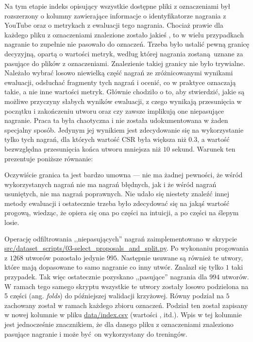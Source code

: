 Na tym etapie indeks opisujący wszystkie dostępne pliki z oznaczeniami był rozszerzony o kolumny zawierające informacje o identyfikatorze nagrania z YouTube oraz o metrykach z ewaluacji tego nagrania. Chociaż prawie dla każdego pliku z oznaczeniami znalezione zostało jakieś , to w wielu przypadkach nagranie to zupełnie nie pasowało do oznaczeń. Trzeba było ustalić pewną granicę decyzyjną, opartą o wartości metryk, według której nagrania zostaną uznane za pasujące do plików z oznaczeniami. Znalezienie takiej granicy nie było trywialne. Należało wybrać losowo niewielką część nagrań ze zróżnicowanymi wynikami ewaluacji, odsłuchać fragmenty tych nagrań i ocenić, co w praktyce oznaczają takie, a nie inne wartości metryk. Głównie chodziło o to, aby stwierdzić, jakie są możliwe przyczyny słabych wyników ewaluacji, z czego wynikają przesunięcia w początku i zakończeniu utworu oraz czy zawsze implikują one niepasujące nagranie. Praca ta była chaotyczna i nie została udokumentowana w żaden specjalny sposób. Jedynym jej wynikiem jest zdecydowanie się na wykorzystanie tylko tych nagrań, dla których wartość CSR była większa niż $0.3$, a wartość bezwzględna przesunięcia końca utworu mniejsza niż $10$ sekund. Warunek ten prezentuje poniższe równanie:
\begin{center}
\end{center}
Oczywiście granica ta jest bardzo umowna --- nie ma żadnej pewności, że wśród wykorzystanych nagrań nie ma nagrań błędnych, jak i że wśród nagrań usuniętych, nie ma nagrań poprawnych. Nie udało się niestety znaleźć innej metody ewaluacji i ostatecznie trzeba było zdecydować się na jakąś wartość progową, wiedząc, że opiera się ona po części na intuicji, a po części na ślepym losie.

Operację odfiltrowania ,,niepasujących'' nagrań zaimplementowano w skrypcie \url{src/dataset_scripts/03-select_proposals_and_split.py}. Po wykonaniu progowania z $1268$ utworów pozostało jedynie $995$. Następnie usuwane są również te utwory, które mają dopasowane to samo nagranie co inny utwór. Znalazł się tylko $1$ taki przypadek. Tak więc ostatecznie pozyskano ,,pasujące'' nagrania dla $994$ utworów. W ramach tego samego skryptu wszystkie te utwory zostały losowo podzielona na 5 części (ang. \emph{folds}) do późniejszej walidacji krzyżowej. Równy podział na $5$ zachowany został w ramach każdego zbioru oznaczeń. Podział ten został zapisany w nowej kolumnie  w pliku \url{data/index.csv} (wartości ,  itd.). Wpis w tej kolumnie jest jednocześnie znacznikiem, że dla danego pliku z oznaczeniami znaleziono pasujące nagranie i może być on wykorzystany do treningów.


